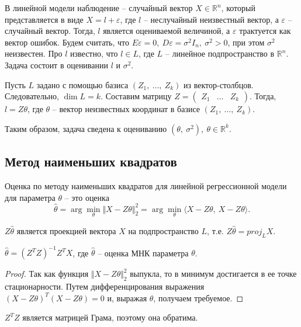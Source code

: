 В линейной модели наблюдение -- случайный вектор $\displaystyle X\in \mathbb{R}^{n}$, который представляется в виде $\displaystyle X=l+\varepsilon $, где $\displaystyle l$ -- неслучайный неизвестный вектор, а $\displaystyle \varepsilon $ -- случайный вектор. Тогда, $\displaystyle l$ является оцениваемой величиной, а $\displaystyle \varepsilon $ трактуется как вектор ошибок. Будем считать, что $\displaystyle E\varepsilon =0,\ D\varepsilon =\sigma ^{2} I_{n},\ \sigma^2 > 0$, при этом $\displaystyle \sigma ^{2}$ неизвестен. Про $\displaystyle l$ известно, что $\displaystyle l\in L$, где $\displaystyle L$ -- линейное подпространство в $\displaystyle \mathbb{R}^{n}$. Задача состоит в оценивании $\displaystyle l$ и $\displaystyle \sigma ^{2}$.

Пусть $\displaystyle L$ задано с помощью базиса $\displaystyle ( Z_{1} ,\ \dotsc ,\ Z_{k})$ из вектор-столбцов. Следовательно, $\displaystyle \dim L=k$. Составим матрицу $\displaystyle Z=\begin{pmatrix}
Z_{1} & \dotsc  & Z_{k}
\end{pmatrix}$. Тогда, $\displaystyle l=Z\theta $, где $\displaystyle \theta $ -- вектор неизвестных координат в базисе $\displaystyle ( Z_{1} ,\ \dotsc ,\ Z_{k})$.

Таким образом, задача сведена к оцениванию $\displaystyle \left( \theta ,\ \sigma ^{2}\right) ,\ \theta \in \mathbb{R}^{k}$.
\subsection{Метод наименьших квадратов}
\begin{definition}
    Оценка по методу наименьших квадратов для линейной регрессионной модели для параметра $\displaystyle \theta $ -- это оценка
    \begin{equation*}
        \hat{\theta } =\arg\min_{\theta }\Vert X-Z\theta \Vert _{2}^{2} =\arg\min_{\theta }\langle X-Z\theta ,\ X-Z\theta \rangle .
    \end{equation*}
\end{definition}
\begin{note}
    $\displaystyle Z\hat{\theta }$ является проекцией вектора $\displaystyle X$ на подпространство $\displaystyle L$, т.е. $\displaystyle Z\hat{\theta } =proj_{L} X$.
\end{note}
\begin{lemma}
    $\displaystyle \hat{\theta } =\left( Z^{T} Z\right)^{-1} Z^{T} X$, где $\displaystyle \hat{\theta }$ -- оценка МНК параметра $\displaystyle \theta $.
\end{lemma}
\begin{proof}
    Так как функция $\displaystyle \Vert X-Z\theta \Vert _{2}^{2}$ выпукла, то в минимум достигается в ее точке стационарности. Путем дифференцирования выражения $\displaystyle ( X-Z\theta )^{T}( X-Z\theta ) =0$ и, выражая $\displaystyle \theta $, получаем требуемое.
\end{proof}
\begin{note}
    $\displaystyle Z^{T} Z$ является матрицей Грама, поэтому она обратима.
\end{note}
